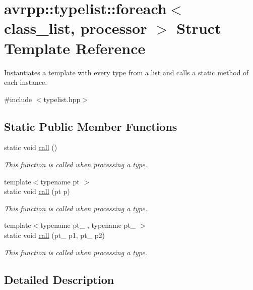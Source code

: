 \hypertarget{structavrpp_1_1typelist_1_1foreach}{
\section{avrpp::typelist::foreach$<$ class\_\-list, processor $>$ Struct Template Reference}
\label{structavrpp_1_1typelist_1_1foreach}
}


Instantiates a template with every type from a list and calls a static method of each instance.  




{\ttfamily \#include $<$typelist.hpp$>$}

\subsection*{Static Public Member Functions}
\begin{DoxyCompactItemize}
\item 
static void \hyperlink{structavrpp_1_1typelist_1_1foreach_a09cabccc5d1f58a842061ca003d5fc34}{call} ()
\begin{DoxyCompactList}\small\item\em This function is called when processing a type. \item\end{DoxyCompactList}\item 
{\footnotesize template$<$typename pt $>$ }\\static void \hyperlink{structavrpp_1_1typelist_1_1foreach_a3b7658b03d818c10645ea4cc49d6da72}{call} (pt p)
\begin{DoxyCompactList}\small\item\em This function is called when processing a type. \item\end{DoxyCompactList}\item 
{\footnotesize template$<$typename pt\_ , typename pt\_ $>$ }\\static void \hyperlink{structavrpp_1_1typelist_1_1foreach_aa7005785342b224cce9aa4b2a582caa5}{call} (pt\_ p1, pt\_ p2)
\begin{DoxyCompactList}\small\item\em This function is called when processing a type. \item\end{DoxyCompactList}\end{DoxyCompactItemize}


\subsection{Detailed Description}
